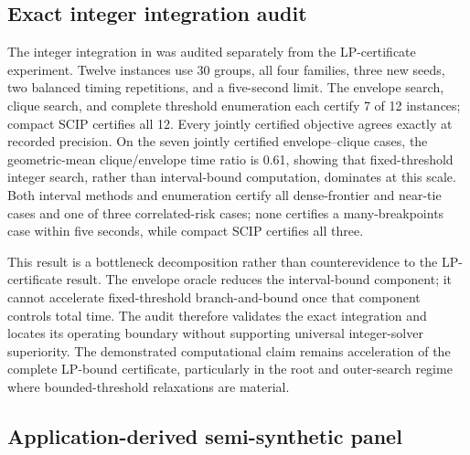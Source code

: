 \documentclass[11pt]{article}
\theoremstyle{plain}
\theoremstyle{definition}
\theoremstyle{remark}
\begin{document}
\FloatBarrier

\subsection{Exact integer integration audit}

The integer integration in  was audited separately from the LP-certificate experiment.  Twelve instances use 30 groups, all four families, three new seeds, two balanced timing repetitions, and a five-second limit.  The envelope search, clique search, and complete threshold enumeration each certify 7 of 12 instances; compact SCIP certifies all 12.  Every jointly certified objective agrees exactly at recorded precision.  On the seven jointly certified envelope--clique cases, the geometric-mean clique/envelope time ratio is 0.61, showing that fixed-threshold integer search, rather than interval-bound computation, dominates at this scale.  Both interval methods and enumeration certify all dense-frontier and near-tie cases and one of three correlated-risk cases; none certifies a many-breakpoints case within five seconds, while compact SCIP certifies all three.

This result is a bottleneck decomposition rather than counterevidence to the LP-certificate result.  The envelope oracle reduces the interval-bound component; it cannot accelerate fixed-threshold branch-and-bound once that component controls total time.  The audit therefore validates the exact integration and locates its operating boundary without supporting universal integer-solver superiority.  The demonstrated computational claim remains acceleration of the complete LP-bound certificate, particularly in the root and outer-search regime where bounded-threshold relaxations are material.

\subsection{Application-derived semi-synthetic panel}
\end{document}
